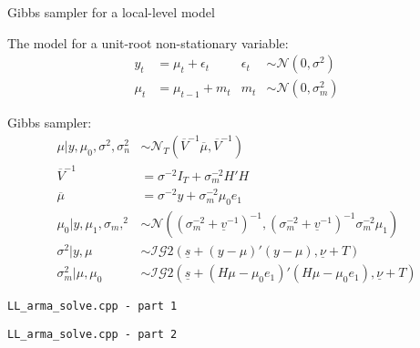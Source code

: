 \documentclass[notes,blackandwhite,mathsans]{beamer}
\begin{document}
{
\begin{frame}{Gibbs sampler for a local-level model}

The model for a unit-root non-stationary variable:
\begin{align*}
y_t &= \mu_t + \epsilon_t & \epsilon_t &\sim\mathcal{N}\left(0,\sigma^2\right)\\
\mu_t &= \mu_{t-1} + m_t & m_t &\sim\mathcal{N}\left(0,\sigma_m^2\right)
\end{align*}

Gibbs sampler:\footnotesize
\begin{align*}
\mu|y, \mu_0, \sigma^2, \sigma_n^2 &\sim\mathcal{N}_T\left( \overline{V}^{-1}\overline{\mu}, \overline{V}^{-1} \right)\\[1ex]
\overline{V}^{-1} &= \sigma^{-2}I_T + \sigma_m^{-2}H'H\\
\overline{\mu} &= \sigma^{-2}y + \sigma_m^{-2}\mu_0 e_{1}\\[1ex]
\mu_0|y, \mu_1, \sigma_m,^2 &\sim\mathcal{N}\left( \left( \sigma_m^{-2} + \underline{v}^{-1} \right)^{-1}, \left( \sigma_m^{-2} + \underline{v}^{-1} \right)^{-1}\sigma_m^{-2}\mu_1 \right)\\
\sigma^2|y,\mu
 &\sim\mathcal{IG}2\left(\underline{s} + (y-\mu)'(y-\mu), \underline{\nu} + T  \right)\\
\sigma_m^2|\mu, \mu_0 &\sim\mathcal{IG}2\left(\underline{s} + (H\mu-\mu_0e_{1})'(H\mu-\mu_0e_{1}), \underline{\nu} + T  \right)
\end{align*}

\end{frame}





\begin{frame}[fragile]
\texttt{LL\_arma\_solve.cpp - part 1}\\ 

\end{frame}



\begin{frame}[fragile]
\texttt{LL\_arma\_solve.cpp - part 2}\\ 

\end{frame}



}
\end{document}
